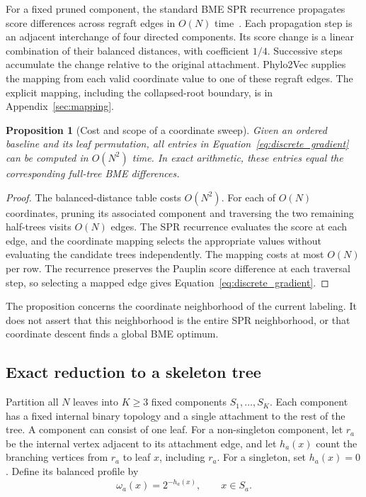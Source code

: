\documentclass[11pt,a4paper]{article}
\makeatletter
\DeclareRobustCommand{\_}{\ifmmode\nfss@text{\textunderscore}\else\textunderscore\allowbreak\fi}
\newtheorem{proposition}[theorem]{Proposition}
\theoremstyle{definition}
\makeatother
\begin{document}
For a fixed pruned component, the standard BME SPR recurrence propagates score differences across regraft edges in $O(N)$ time~\cite{hordijk2005spr}.
Each propagation step is an adjacent interchange of four directed components.
Its score change is a linear combination of their balanced distances, with coefficient $1/4$.
Successive steps accumulate the change relative to the original attachment.
Phylo2Vec supplies the mapping from each valid coordinate value to one of these regraft edges.
The explicit mapping, including the collapsed-root boundary, is in Appendix~\ref{sec:mapping}.

\begin{proposition}[Cost and scope of a coordinate sweep]
\label{prop:quadratic}
Given an ordered baseline and its leaf permutation, all entries in
Equation~\eqref{eq:discrete_gradient} can be computed in $O(N^2)$ time.
In exact arithmetic, these entries equal the corresponding full-tree BME differences.
\end{proposition}
\begin{proof}
The balanced-distance table costs $O(N^2)$.
For each of $O(N)$ coordinates, pruning its associated component and traversing the two remaining half-trees visits $O(N)$ edges.
The SPR recurrence evaluates the score at each edge, and the coordinate mapping selects the appropriate values without evaluating the candidate trees independently.
The mapping costs at most $O(N)$ per row.
The recurrence preserves the Pauplin score difference at each traversal step, so selecting a mapped edge gives Equation~\eqref{eq:discrete_gradient}.
\end{proof}

The proposition concerns the coordinate neighborhood of the current labeling.
It does not assert that this neighborhood is the entire SPR neighborhood, or that coordinate descent finds a global BME optimum.

\subsection{Exact reduction to a skeleton tree}
\label{sec:condensation}

Partition all $N$ leaves into $K\geq3$ fixed components $S_1,\ldots,S_K$.
Each component has a fixed internal binary topology and a single attachment to the rest of the tree.
A component can consist of one leaf.
For a non-singleton component, let $r_a$ be the internal vertex adjacent to its attachment edge, and let $h_a(x)$ count the branching vertices from $r_a$ to leaf $x$, including $r_a$.
For a singleton, set $h_a(x)=0$.
Define its balanced profile by
\begin{equation}
 \omega_a(x)=2^{-h_a(x)},\qquad x\in S_a.
 \label{eq:profile}
\end{equation}
\end{document}

